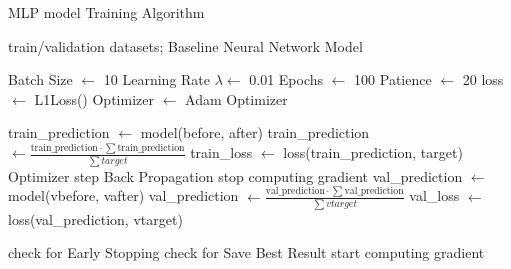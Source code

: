 \begin{algorithm}[H]
	\caption{MLP model Training Algorithm}\label{alg:ufcntraining}
	\begin{algorithmic}
		\Require train/validation datasets; Baseline Neural Network Model

		\State Batch Size $\gets$ 10
		\State Learning Rate $\lambda \gets$ 0.01
		\State Epochs $\gets$ 100
		\State Patience $\gets$ 20
		\State loss $\gets$ L1Loss()
		\State Optimizer $\gets$ Adam Optimizer
		\State

		\State train\_prediction $\gets$ model(before, after) 
		\State train\_prediction $\gets \frac{\text{train\_prediction} \cdot \sum\text{train\_prediction}}{\sum target}$ 
		\State train\_loss $\gets$ loss(train\_prediction, target)
		\State Optimizer step
		\State Back Propagation
		\EndFor
		\State stop computing gradient
		\State val\_prediction $\gets$ model(vbefore, vafter) 
		\State val\_prediction $\gets \frac{\text{val\_prediction} \cdot \sum\text{val\_prediction}}{\sum vtarget}$ 
		\State val\_loss $\gets$ loss(val\_prediction, vtarget)
		\EndFor

		\State check for Early Stopping
		\State check for Save Best Result
		\State start computing gradient
		\EndFor
	\end{algorithmic}
\end{algorithm}
